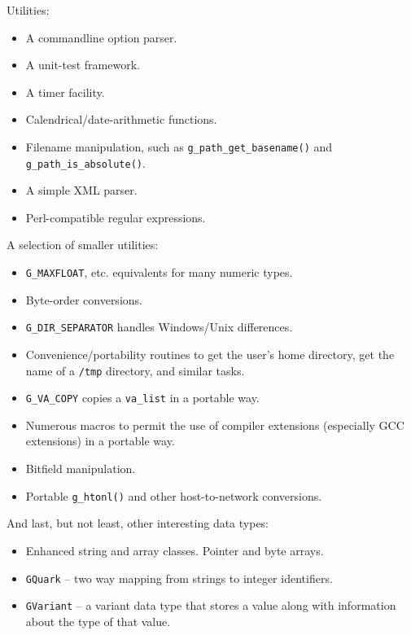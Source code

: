 Utilities:
\begin{itemize}
  \item A commandline option parser.
  \item A unit-test framework.
  \item A timer facility.
  \item Calendrical/date-arithmetic functions.
  \item Filename manipulation, such as \lstinline{g_path_get_basename()} and \lstinline{g_path_is_absolute()}.
  \item A simple XML parser.
  \item Perl-compatible regular expressions.
\end{itemize}

A selection of smaller utilities:
\begin{itemize}
  \item \lstinline{G_MAXFLOAT}, etc. equivalents for many numeric types.
  \item Byte-order conversions.
  \item \lstinline{G_DIR_SEPARATOR} handles Windows/Unix differences.
  \item Convenience/portability routines to get the user's home directory, get the name of a \texttt{/tmp} directory, and similar tasks.
  \item \lstinline{G_VA_COPY} copies a \lstinline{va_list} in a portable way.
  \item Numerous macros to permit the use of compiler extensions (especially GCC extensions) in a portable way.
  \item Bitfield manipulation.
  \item Portable \lstinline{g_htonl()} and other host-to-network conversions.
\end{itemize}

And last, but not least, other interesting data types:
\begin{itemize}
  \item Enhanced string and array classes. Pointer and byte arrays.
  \item \lstinline{GQuark} -- two way mapping from strings to integer identifiers.
  \item \lstinline{GVariant} -- a variant data type that stores a value along with information about the type of that value.
\end{itemize}
